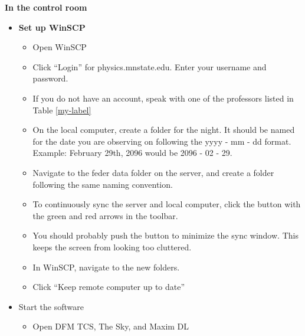 \documentclass[letterpaper, 12pt]{report}
\begin{document}
{\large\textbf{In the control room}}
\begin{itemize}
	\item \textbf{Set up WinSCP}
	\begin{itemize}
		\item Open WinSCP
		\item Click ``Login'' for physics.mnstate.edu. Enter your username and password.
		\item If you do not have an account, speak with one of the professors listed in Table \ref{my-label}
		\item On the local computer, create a folder for the night. It should be named for the date you are observing on following the yyyy - mm - dd format. Example: February 29th, 2096 would be 2096 - 02 - 29.
		\item Navigate to the feder data folder on the server, and create a folder following the same naming convention.
		\item To continuously sync the server and local computer, click the button with the green and red arrows in the toolbar.
		\item You should probably push the button to minimize the sync window. This keeps the screen from looking too cluttered.
		\item In WinSCP, navigate to the new folders.
		\item Click ``Keep remote computer up to date''
	\end{itemize}
	\item Start the software
	\begin{itemize}
		\item Open DFM TCS, The Sky, and Maxim DL
	\end{itemize}

\end{itemize}
\end{document}
